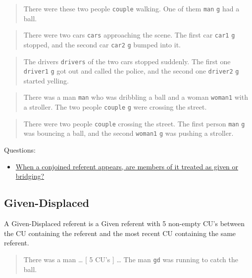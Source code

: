 \documentclass[
]{book}
\providecommand{\tightlist}{%
  \setlength{\itemsep}{0pt}\setlength{\parskip}{0pt}}
\begin{document}
\begin{quote}
There were these two people \texttt{couple} walking.
One of them \texttt{man} \texttt{g} had a ball.
\end{quote}

\begin{quote}
There were two cars \texttt{cars} approaching the scene.
The first car \texttt{car1} \texttt{g} stopped, and the second car \texttt{car2} \texttt{g} bumped into it.
\end{quote}

\begin{quote}
The drivers \texttt{drivers} of the two cars stopped suddenly.
The first one \texttt{driver1} \texttt{g} got out and called the police,
and the second one \texttt{driver2} \texttt{g} started yelling.
\end{quote}

\begin{quote}
There was a man \texttt{man} who was dribbling a ball and a woman \texttt{woman1} with a stroller.
The two people \texttt{couple} \texttt{g} were crossing the street.
\end{quote}

\begin{quote}
There were two people \texttt{couple} crossing the street.
The first person \texttt{man} \texttt{g} was bouncing a ball,
and the second \texttt{woman1} \texttt{g} was pushing a stroller.
\end{quote}

Questions:

\begin{itemize}
\tightlist
\item
  \protect\hyperlink{conjoined-referent-members}{When a conjoined referent appears, are members of it treated as given or bridging?}
\end{itemize}

\hypertarget{given-displaced}{%
\subsection{Given-Displaced}\label{given-displaced}}

A Given-Displaced referent is a Given referent with 5 non-empty CU's between the CU containing the referent and the most recent CU containing the same referent.

\begin{quote}
There was a man \ldots{}
{[} 5 CU's {]} \ldots{}
The man \texttt{gd} was running to catch the ball.
\end{quote}
\end{document}
